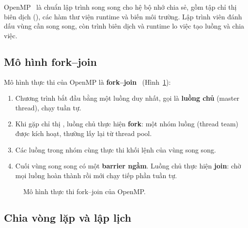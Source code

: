 OpenMP~\cite{openmp52} là chuẩn lập trình song song cho hệ bộ nhớ chia sẻ, gồm tập chỉ thị biên dịch (), các hàm thư viện runtime và biến môi trường. Lập trình viên đánh dấu vùng cần song song, còn trình biên dịch và runtime lo việc tạo luồng và chia việc.

\subsection{Mô hình fork--join}

Mô hình thực thi của OpenMP là \textbf{fork--join}~\cite{openmp52} (Hình~\ref{fig:fork-join}):
\begin{enumerate}
\item Chương trình bắt đầu bằng một luồng duy nhất, gọi là \textbf{luồng chủ} (master thread), chạy tuần tự.
\item Khi gặp chỉ thị , luồng chủ thực hiện \textbf{fork}: một nhóm luồng (thread team) được kích hoạt, thường lấy lại từ thread pool.
\item Các luồng trong nhóm cùng thực thi khối lệnh của vùng song song.
\item Cuối vùng song song có một \textbf{barrier ngầm}. Luồng chủ thực hiện \textbf{join}: chờ mọi luồng hoàn thành rồi mới chạy tiếp phần tuần tự.
\end{enumerate}

\begin{figure}[H]
\centering
{}
\caption{Mô hình thực thi fork--join của OpenMP.}
\label{fig:fork-join}
\end{figure}

\subsection{Chia vòng lặp và lập lịch}

